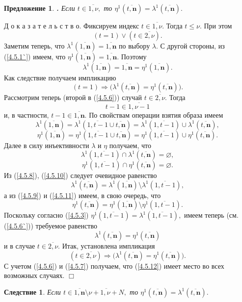 \documentclass[11pt,twoside,openany]{report}
\newcommand{\bfn}{\begin{equation}}
\newcommand{\efn}{\end{equation}}
\newcommand{\ov}{\overline}
\newcounter{theo}
\newcounter{cor}
\newcounter{pred}
\newtheorem{pred}{Предложение}[section]
\newtheorem{cor}{Следствие}[section]
\newcommand{\TL}{\mbox{\bf{$\!\!$.}}}
\newcommand{\la}{\lambda}
\newcommand{\emp}{\varnothing}
\begin{document}
{{\begin{pred}\label{p4.5.1}{\TL} Если $t\in \ov{1,\nu},$ то $\eta^1(\ov{t,\mathbf{n}}) =
\la^1(\ov{t,\mathbf{n}}).$
\end{pred}

Д о к а з а т е л ь с т в о. Фиксируем индекс $t\in \ov{1,\nu}.$ Тогда $t\leqslant \nu.$ При этом
\bfn\label{4.5.6}(t=1) \vee (t\in \ov{2,\nu}).
\efn
Заметим теперь, что $\la^1(\ov{1,\mathbf{n}}) = \ov{1,\mathbf{n}}$ по выбору $\la.$
С другой стороны, из (\ref{4.5.1`}) имеем, что $\eta^1(\ov{1,\mathbf{n}}) =\ov{1,\mathbf{n}}.$
Поэтому
\bfn\label{4.5.6`}
\la^1(\ov{1,\mathbf{n}})  =\ov{1,\mathbf{n}} =\eta^1(\ov{1,\mathbf{n}}).
\efn
Как следствие получаем импликацию
\bfn\label{4.5.7}
(t=1)\Longrightarrow \bigl(\la^1(\ov{t,\mathbf{n}}) = \eta^1(\ov{t,\mathbf{n}})\bigl).
\efn
Рассмотрим теперь (второй в (\ref{4.5.6})) случай $t\in \ov{2,\nu}.$ Тогда
$$
t-1 \in \ov{1,\nu-1}
$$
и, в частности, $t-1\in \ov{1,\mathbf{n}}.$ По свойствам операции взятия образа имеем
\bfn\label{4.5.8}
\la^1(\ov{1,\mathbf{n}}) = \la^1(\ov{1,t-1} \cup \ov{t,\mathbf{n}}) = \la^1(\ov{1,t-1})
\cup \la^1(\ov{t,\mathbf{n}}),
\efn
\bfn\label{4.5.9}
\eta^1(\ov{1,\mathbf{n}}) = \eta^1(\ov{1,t-1} \cup \ov{t,\mathbf{n}}) = \eta^1(\ov{1,t-1})
\cup \eta^1(\ov{t,\mathbf{n}}).
\efn
Далее в силу инъективности $\la$ и $\eta$ получаем, что
\bfn\label{4.5.10}
\la^1(\ov{1,t-1}) \cap  \la^1(\ov{t,\mathbf{n}}) = \emp,
\efn
\bfn\label{4.5.11}
\eta^1(\ov{1,t-1}) \cap  \eta^1(\ov{t,\mathbf{n}}) = \emp.
\efn
Из (\ref{4.5.8}), (\ref{4.5.10})  следует очевидное равенство
$$
\la^1(\ov{t,\mathbf{n}}) = \la^1(\ov{1,\mathbf{n}})\setminus \la^1(\ov{1,t-1}),
$$
а из (\ref{4.5.9}) и (\ref{4.5.11}) имеем, в свою очередь, что
$$
\eta^1(\ov{t,\mathbf{n}}) = \eta^1(\ov{1,\mathbf{n}})\setminus \eta^1(\ov{1,t-1}).
$$
Поскольку согласно (\ref{4.5.3}) $\eta^1(\ov{1,t-1}) = \la^1(\ov{1,t-1}),$ имеем теперь
(см. (\ref{4.5.6`})) требуемое равенство
\bfn\label{4.5.12}
\la^1(\ov{t,\mathbf{n}}) = \eta^1(\ov{t,\mathbf{n}})
\efn
и в случае $t\in \ov{2,\nu}.$ Итак, установлена импликация
$$
(t\in \ov{2,\nu}) \Longrightarrow \bigl(\la^1(\ov{t,\mathbf{n}}) = \eta^1(\ov{t,\mathbf{n}})\bigl).
$$
С учетом (\ref{4.5.6}) и (\ref{4.5.7}) получаем, что (\ref{4.5.12}) имеет место во всех
возможных случаях. \hfill $\Box$

\begin{cor}\label{c4.5.1}
Если $t\in \ov{1,\mathbf{n}}\setminus \ov{\nu+1,\nu+N},$ то $\eta^1(\ov{t,\mathbf{n}}) =
\la^1(\ov{t,\mathbf{n}}).$
\end{cor}

}}
\end{document}
